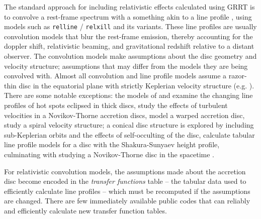 \documentclass[fleqn,usenatbib]{mnras}
\begin{document}
The standard approach for including relativistic effects calculated using GRRT
is to convolve a rest-frame spectrum with a something akin to a line profile
\citep{fabian_x-ray_1989, laor_line_1991}, using models such as \texttt{relline}
/ \texttt{relxill} \citep{dauser_broad_2010, dauser_relativistic_2016}  and its
variants. These line profiles are usually convolution models that blur the
rest-frame emission, thereby accounting for the doppler shift, relativistic
beaming, and gravitational redshift relative to a distant observer. The
convolution models make assumptions about the disc geometry and velocity
structure; assumptions that may differ from the models they are being convolved
with. Almost all convolution and line profile models assume a razor-thin disc in
the equatorial plane with strictly Keplerian velocity structure (e.g.
\citealt{dovciak_extended_2004, beckwith_iron_2004, brenneman_constraining_2006,
dauser_broad_2010}). There are some notable exceptions: the models of
\cite{karas_light_1992} and \cite{karas_vicinity_1992} examine the changing line
profiles of hot spots eclipsed in thick discs, \cite{pariev_line_1998} study the
effects of turbulent velocities in a Novikov-Thorne accretion discs,
\cite{hartnoll_reprocessed_2001} model a warped accretion disc,
\cite{fukumura_iron_2004} study a spiral velocity structure; a conical disc
structure is explored by \cite{wu_iron_2007} including sub-Keplerian orbits and
the effects of self-occulting of the disc, \cite{taylor_exploring_2018}
calculate tabular line profile models for a disc with the Shakura-Sunyaev height
profile, culminating with \cite{abdikamalov_testing_2020} studying a
Novikov-Thorne disc in the \citet{johannsen_regular_2013} spacetime .

For relativistic convolution models, the assumptions made about the accretion
disc become encoded in the \textit{transfer functions} table -- the tabular data
used to efficiently calculate line profiles -- which must be recomputed if the
assumptions are changed. There are few immediately available public codes that
can reliably and efficiently calculate new transfer function tables.
\end{document}
